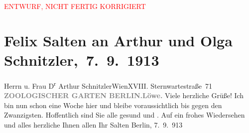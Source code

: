 
\begin{center}
            \textcolor{red}{ENTWURF, NICHT FERTIG KORRIGIERT}
                      \end{center}
            
         
         \renewcommand{\erwaehntePersonen}{Personen: Olga Schnitzler, Heinrich Schnitzler}
         \renewcommand{\erwaehnteOrte}{Orte: Berlin, Charlottenburg, Sternwartestraße 71, Wien, Zoologischer Garten Berlin}
         \renewcommand{\erwaehnteWerke}{}
               \section[ Felix Salten an Arthur und Olga Schnitzler, 7. 9. 1913]{ Felix Salten an Arthur und Olga Schnitzler, 7. 9. 1913}\nopagebreak{}\rehead{ }\begin{ledgroupsized}[t]{13cm}\normalsize\beginnumbering \toendnotes[C]{\smallbreak\pagebreak[2]} 
\toendnotes[C]{\smallbreak}\pstart{}{\pb}Herrn u. Frau D\textsuperscript{r} Arthur Schnitzler\pend{}\pstart{}Wien\pend{}\pstart{}XVIII. Sternwartestraße 71\pend{}{\bigskip}\pstart
           \noindent{}{\pb}\textcolor{gray}{\textbf{ZOOLOGISCHER GARTEN BERLIN.}}\hfill \textcolor{gray}{\textbf{Löwe.}}\pend
           \pstart
           {\pb}Viele herzliche Grüße!\pend
           \pstart
           Ich bin nun schon eine Woche hier und bleibe
               voraussichtlich bis gegen den Zwanzigsten. Hoffentlich
               sind Sie alle gesund und \label{K_L03562-1v}\label{K_L03562-1h}. Auf ein frohes Wiedersehen und alles herzliche Ihnen allen\pend
           \pstart Ihr \spacefill\mbox{Salten}\pend{}\pstart
           Berlin, 7. 9. 913\pend
           
         
         \endnumbering{}\end{ledgroupsized}  \newcommand{\dateiname}{L03562}\newcommand{\titel}{Felix Salten an Arthur und Olga Schnitzler, 7. 9. 1913}\newcommand{\editorInnen}{Martin Anton Müller und Laura Untner}
      